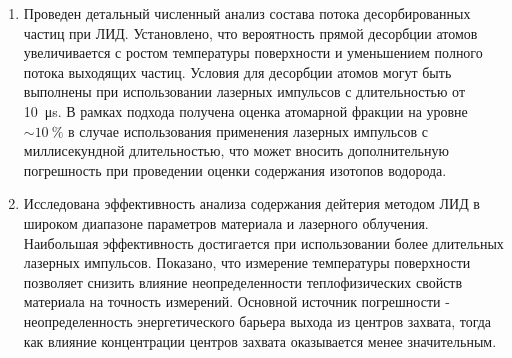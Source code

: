 \begin{enumerate}
  \item Проведен детальный численный анализ состава потока десорбированных частиц при ЛИД. Установлено, что вероятность прямой десорбции атомов увеличивается с ростом температуры поверхности и уменьшением полного потока выходящих частиц. Условия для десорбции атомов могут быть выполнены при использовании лазерных импульсов с длительностью от \SI{10}{\micro\second}. В рамках подхода получена оценка атомарной фракции на уровне \( \sim \SI{10}{\percent} \) в случае использования применения лазерных импульсов с миллисекундной длительностью, что может вносить дополнительную погрешность при проведении оценки содержания изотопов водорода.
  \item Исследована эффективность анализа содержания дейтерия методом ЛИД в широком диапазоне параметров материала и лазерного облучения. Наибольшая эффективность достигается при использовании более длительных лазерных импульсов. Показано, что измерение температуры поверхности позволяет снизить влияние неопределенности теплофизических свойств материала на точность измерений. Основной источник погрешности - неопределенность энергетического барьера выхода из центров захвата, тогда как влияние концентрации центров захвата оказывается менее значительным.    
\end{enumerate}
